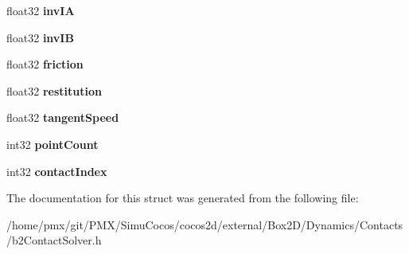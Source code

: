 \begin{DoxyCompactItemize}
float32 {\bfseries inv\+IA}
\item 
\mbox{\label{structb2ContactVelocityConstraint_aae02d4fd8f60353385b9cc876dc78a81}} 
float32 {\bfseries inv\+IB}
\item 
\mbox{\label{structb2ContactVelocityConstraint_a11025786ae828eeeb60dfcd15358d934}} 
float32 {\bfseries friction}
\item 
\mbox{\label{structb2ContactVelocityConstraint_a6734f74c1970abc64ed7dcffd8737257}} 
float32 {\bfseries restitution}
\item 
\mbox{\label{structb2ContactVelocityConstraint_aaf6acabb0ef62eeac647250e2520a272}} 
float32 {\bfseries tangent\+Speed}
\item 
\mbox{\label{structb2ContactVelocityConstraint_a1decd7bf6a5dc61bd72d4e87b070a660}} 
int32 {\bfseries point\+Count}
\item 
\mbox{\label{structb2ContactVelocityConstraint_a4c76b9292f28859e2f8c9d075e79b873}} 
int32 {\bfseries contact\+Index}
\end{DoxyCompactItemize}


The documentation for this struct was generated from the following file\+:\begin{DoxyCompactItemize}
\item 
/home/pmx/git/\+P\+M\+X/\+Simu\+Cocos/cocos2d/external/\+Box2\+D/\+Dynamics/\+Contacts/b2\+Contact\+Solver.\+h\end{DoxyCompactItemize}
